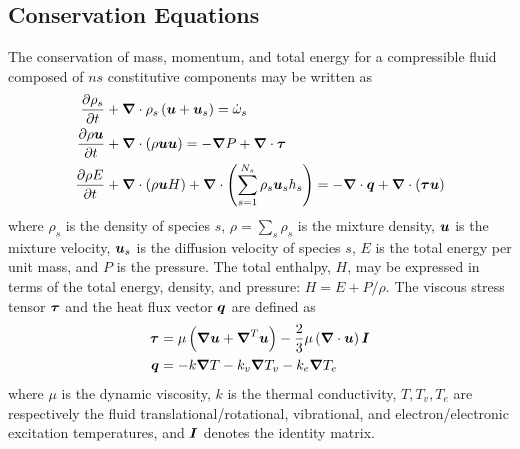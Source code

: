 \subsection{Conservation Equations}
The conservation of mass, momentum, and total energy for a compressible fluid composed of $ns$ constitutive components may be written as
\begin{align}
  \label{eq:pde_comp_mass_us}
  {\frac{\partial{\rho_s}}{\partial{t}}} &+ {\boldsymbol{\nabla}} {}\cdot \rho_s\left({\boldsymbol{u}} + {\boldsymbol{u}}_s\right) = \dot{\omega}_s \\
  \label{eq:pde_comp_mom_us}
  {\frac{\partial{\rho{\boldsymbol{u}}}}{\partial{t}}} &+ {\boldsymbol{\nabla}} {}\cdot\left(\rho{\boldsymbol{u}}{\boldsymbol{u}}\right) =
    -{\boldsymbol{\nabla}} {P} + {\boldsymbol{\nabla}} {}\cdot{\boldsymbol{\tau}} \\
  \label{eq:pde_comp_energy_us}
  {\frac{\partial{\rho E}}{\partial{t}}} &+ {\boldsymbol{\nabla}} {}\cdot\left(\rho{\boldsymbol{u}}H\right) + {\boldsymbol{\nabla}} {}\cdot\left(\sum_{s=1}^{N_s}\rho_s{\boldsymbol{u}}_sh_s \right) =
    -{\boldsymbol{\nabla}} {}\cdot{\boldsymbol{q}}   + {\boldsymbol{\nabla}} {}\cdot\left({\boldsymbol{\tau}}{\boldsymbol{u}}\right)  
\end{align}
where $\rho_s$ is the density of species $s$, $\rho=\sum_s \rho_s$ is the mixture density, ${\boldsymbol{u}}$ is the mixture velocity, ${\boldsymbol{u}}_s$ is the diffusion velocity of species $s$, $E$ is the total energy per unit mass, and $P$ is the pressure.  The total enthalpy, $H$, may be expressed in terms of the total energy, density, and pressure: $H = E + P/\rho$.  The viscous stress tensor ${\boldsymbol{\tau}}$ and the heat flux vector ${\boldsymbol{q}}$ are defined as
\begin{align}
  \label{eq:stress_tensor}
  {\boldsymbol{\tau}} &= \mu\left({\boldsymbol{\nabla}} {{\boldsymbol{u}}} + {\boldsymbol{\nabla}}^T {{\boldsymbol{u}}}\right) -\frac{2}{3}\mu \left({\boldsymbol{\nabla}} {}\cdot{\boldsymbol{u}}\right){\boldsymbol{I}} \\
  \label{eq:fouriers_law}
  {\boldsymbol{q}} &= -k{\boldsymbol{\nabla}} {T} - k_v{\boldsymbol{\nabla}} {T_v} - k_e{\boldsymbol{\nabla}} {T_e}
\end{align}
where $\mu$ is the dynamic viscosity, $k$ is the thermal conductivity, $T,T_v,T_e$ are respectively the fluid translational/rotational, vibrational, and electron/electronic excitation temperatures, and ${\boldsymbol{I}}$ denotes the identity matrix.  

